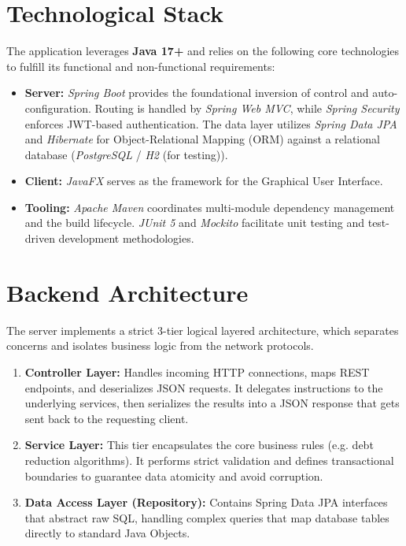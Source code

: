 \section{Technological Stack}
The application leverages \textbf{Java 17+} and relies on the following core technologies to fulfill its functional and non-functional requirements:

\begin{itemize}
    \item \textbf{Server:} \textit{Spring Boot} provides the foundational inversion of control and auto-configuration. Routing is handled by \textit{Spring Web MVC}, while \textit{Spring Security} enforces JWT-based authentication. The data layer utilizes \textit{Spring Data JPA} and \textit{Hibernate} for Object-Relational Mapping (ORM) against a relational database (\textit{PostgreSQL} / \textit{H2} (for testing)).
    \item \textbf{Client:} \textit{JavaFX} serves as the framework for the Graphical User Interface.
    \item \textbf{Tooling:} \textit{Apache Maven} coordinates multi-module dependency management and the build lifecycle. \textit{JUnit 5} and \textit{Mockito} facilitate unit testing and test-driven development methodologies.
\end{itemize}

\section{Backend Architecture}
The server implements a strict 3-tier logical layered architecture, which separates concerns and isolates business logic from the network protocols.

\begin{enumerate}
    \item \textbf{Controller Layer:} Handles incoming HTTP connections, maps REST endpoints, and deserializes JSON requests. It delegates instructions to the underlying services, then serializes the results into a JSON response that gets sent back to the requesting client.
    \item \textbf{Service Layer:} This tier encapsulates the core business rules (e.g. debt reduction algorithms). It performs strict validation and defines transactional boundaries to guarantee data atomicity and avoid corruption.
    \item \textbf{Data Access Layer (Repository):} Contains Spring Data JPA interfaces that abstract raw SQL, handling complex queries that map database tables directly to standard Java Objects.
\end{enumerate}


